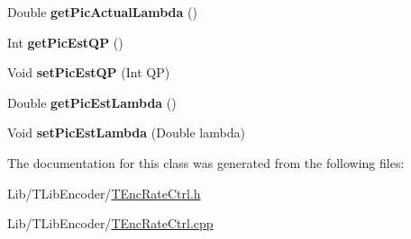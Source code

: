 \begin{DoxyCompactItemize}
\item 
\mbox{\label{class_t_enc_r_c_pic_a8d9bad7b5f2ee535e5454ffcb5bec638}} 
Double {\bfseries get\+Pic\+Actual\+Lambda} ()
\item 
\mbox{\label{class_t_enc_r_c_pic_a73a4a3af8db55fe38ddc7bb69e51a452}} 
Int {\bfseries get\+Pic\+Est\+QP} ()
\item 
\mbox{\label{class_t_enc_r_c_pic_a92d886bc3381fe4f0d46e51ab298ab51}} 
Void {\bfseries set\+Pic\+Est\+QP} (Int QP)
\item 
\mbox{\label{class_t_enc_r_c_pic_ace961023fe3953d5689541601f2f5f50}} 
Double {\bfseries get\+Pic\+Est\+Lambda} ()
\item 
\mbox{\label{class_t_enc_r_c_pic_a4fdd2ae157680d2a90ee1bce2155f0f3}} 
Void {\bfseries set\+Pic\+Est\+Lambda} (Double lambda)
\end{DoxyCompactItemize}


The documentation for this class was generated from the following files\+:\begin{DoxyCompactItemize}
\item 
Lib/\+T\+Lib\+Encoder/\hyperlink{_t_enc_rate_ctrl_8h}{T\+Enc\+Rate\+Ctrl.\+h}\item 
Lib/\+T\+Lib\+Encoder/\hyperlink{_t_enc_rate_ctrl_8cpp}{T\+Enc\+Rate\+Ctrl.\+cpp}\end{DoxyCompactItemize}
